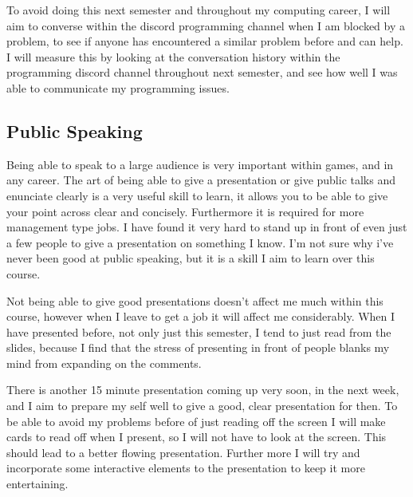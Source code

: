 \documentclass{scrartcl}
\begin{document}

To avoid doing this next semester and throughout my computing career, I will aim to converse within the discord programming channel when I am blocked by a problem, to see if anyone has encountered a similar problem before and can help. I will measure this by looking at the conversation history within the programming discord channel throughout next semester, and see how well I was able to communicate my programming issues.




\subsection{Public Speaking}

Being able to speak to a large audience is very important within games, and in any career. The art of being able to give a presentation or give public talks and enunciate clearly is a very useful skill to learn, it allows you to be able to give your point across clear and concisely. Furthermore it is required for more management type jobs.
I have found it very hard to stand up in front of even just a few people to give a presentation on something I know. I'm not sure why i've never been good at public speaking, but it is a skill I aim to learn over this course.


Not being able to give good presentations doesn't affect me much within this course, however when I leave to get a job it will affect me considerably.
When I have presented before, not only just this semester, I tend to just read from the slides, because I find that the stress of presenting in front of people blanks my mind from expanding on the comments.


There is another 15 minute presentation coming up very soon, in the next week, and I aim to prepare my self well to give a good, clear presentation for then.
To be able to avoid my problems before of just reading off the screen I will make cards to read off when I present, so I will not have to look at the screen. This should lead to a better flowing presentation. Further more I will try and incorporate some interactive elements to the presentation to keep it more entertaining.

\par
\end{document}
